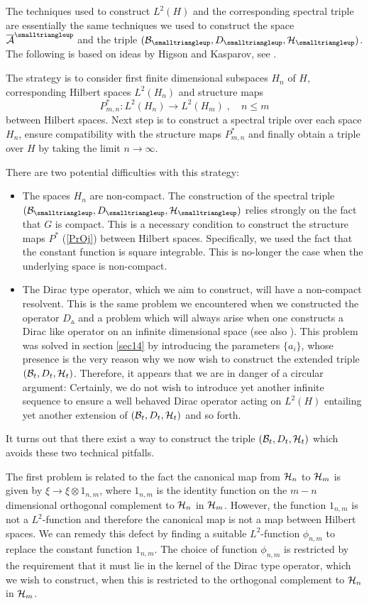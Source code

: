 \documentclass[12pt]{article}
\def\ca{{\cal A}}
\def\cb{{\cal B}}
\def\ch{{\cal H}}
\begin{document}
The techniques used to construct $L^2(H)$ and the corresponding spectral triple are essentially the same techniques we used to construct the space $\overline{\ca}^{\smalltriangleup}$ and the triple $(\cb_{\smalltriangleup},D_{\smalltriangleup},\ch_\smalltriangleup)$. The following is based on ideas by Higson and Kasparov, see \cite{Higson}. 

The strategy is to consider first finite dimensional subspaces $H_n$ of $H$, corresponding Hilbert spaces $L^2(H_n)$ and structure maps
\[
P^\ast_{m,n}:L^2(H_n)\rightarrow L^2(H_m)\;,\quad n\leq m 
\]
between Hilbert spaces. Next step is to construct a spectral triple over each space $H_n$, ensure compatibility with the structure maps $P^\ast_{m,n}$ and finally obtain a triple over $H$ by taking the limit $n\rightarrow\infty$.



There are two potential difficulties with this strategy:
\begin{itemize}
\item
The spaces $H_n$ are non-compact. The construction of the spectral triple $(\cb_{\smalltriangleup},D_{\smalltriangleup},\ch_\smalltriangleup)$ relies strongly on the fact that $G$ is compact. This is a necessary condition to construct the structure maps $P^\ast$ (\ref{PrOj}) between Hilbert spaces. Specifically, we used the fact that the constant function is square integrable. This is no-longer the case when the underlying space is non-compact.
\item
The Dirac type operator, which we aim to construct, will have a non-compact resolvent. This is the same problem we encountered when we constructed the operator $D_{\smalltriangleup}$ and a problem which will always arise when one constructs a Dirac like operator on an infinite dimensional space (see also \cite{Higson}). This problem was solved in section \ref{sec14} by introducing the parameters $\{a_i\}$, whose presence is the very reason why we now wish to construct the extended triple $(\cb_t,D_t,\ch_t)$. Therefore, it appears that we are in danger of a circular argument: Certainly, we do not wish to introduce yet another infinite sequence to ensure a well behaved Dirac operator acting on $L^2(H)$ entailing yet another extension of $(\cb_t,D_t,\ch_t)$ and so forth.
\end{itemize}


It turns out that there exist a way to construct the triple $(\cb_t,D_t,\ch_t)$ which avoids these two technical pitfalls. 

The first problem is related to the fact the canonical map from $\ch_n$ to $\ch_m$ is given by $\xi\rightarrow \xi\otimes 1_{n,m}$, where $1_{n,m}$ is the identity function on the $m-n$ dimensional orthogonal complement to $\ch_n$ in $\ch_m$. However, the function $1_{n,m}$ is not a $L^2$-function and therefore the canonical map is not a map between Hilbert spaces. We can remedy this defect by finding a suitable $L^2$-function $\phi_{n,m}$ to replace the constant function $1_{n,m}$. The choice of function $\phi_{n,m}$ is restricted by the requirement that it must lie in the kernel of the Dirac type operator, which we wish to construct, when this is restricted to the orthogonal complement to $\ch_n$ in $\ch_m$.
\end{document}
